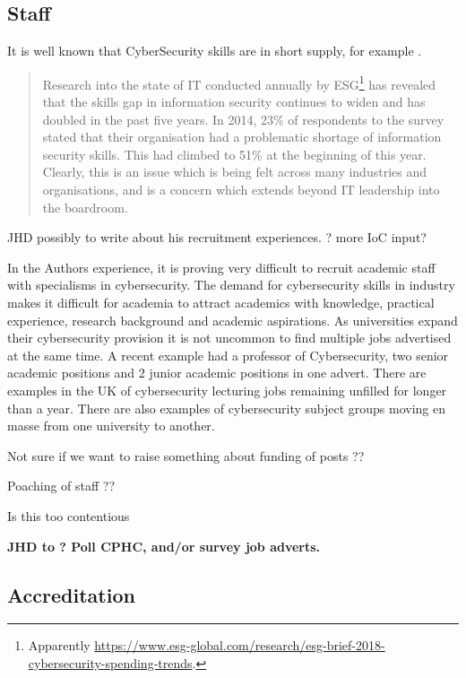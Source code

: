 \documentclass[sigconf,anonymous]{acmart}
\begin{document}
\subsection{Staff}
It is well known that CyberSecurity skills are in short supply, for example \cite{Page2018a}.
\begin{quote}
Research into the state of IT conducted annually by ESG\footnote{Apparently \url{https://www.esg-global.com/research/esg-brief-2018-cybersecurity-spending-trends}.} has revealed that the skills gap in information security continues to widen and has doubled in the past five years. In 2014, 23\% of respondents to the survey stated that their organisation had a problematic shortage of information security skills. This had climbed to 51\% at the beginning of this year. Clearly, this is an issue which is being felt across many industries and organisations, and is a concern which extends beyond IT leadership into the boardroom.
\end{quote}
\begin{quote}

\end{quote}
JHD possibly to write about his recruitment experiences.  ? more IoC input?

In the Authors experience, it is proving very difficult to recruit academic staff with specialisms in cybersecurity. The demand for cybersecurity skills in industry makes it difficult for academia to attract academics with knowledge, practical experience, research background and academic aspirations. As universities expand their cybersecurity provision it is not uncommon to find multiple jobs advertised at the same time.  A recent example had a professor of Cybersecurity, two senior academic positions and 2 junior academic positions in one advert. There are examples in the UK of cybersecurity lecturing jobs remaining unfilled for longer than a year. There are also examples of  cybersecurity subject groups moving en masse from one university to another.

Not sure if we want to raise something about funding of posts ??

Poaching of staff ??

Is this too contentious


{\bf JHD to ? Poll CPHC, and/or survey job adverts.}
\subsection{Accreditation}
\end{document}
